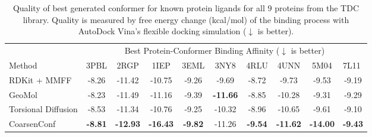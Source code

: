 \begin{table}[b]%
\vspace{-1ex}
\begin{center}
\caption{Quality of best generated conformer for known protein ligands for all 9 proteins from the TDC library. Quality is measured by free energy change (kcal/mol) of the binding process with AutoDock Vina's flexible docking simulation ($\downarrow$ is better).
}
\label{tab:results_oracle}
\begin{tabular}{l|ccccccccc}
\toprule
                    & \multicolumn{9}{c}{Best Protein-Conformer Binding Affinity ($\downarrow$ is better)}                                                                                                                   \\
Method              & 3PBL           & 2RGP            & 1IEP            & 3EML           & 3NY8            & 4RLU & 4UNN            & 5M04            & \multicolumn{1}{l}{7L11}          \\ \hline
RDKit + MMFF       & -8.26          & -11.42          & -10.75          & -9.26          & -9.69           &   -8.72   & -9.73           & -9.53           & -9.19                             \\
GeoMol              & -8.23          & -11.49          & -11.16          & -9.39          & \textbf{-11.66} &  -8.85    & -10.28          & -9.31           & -9.29                             \\
Torsional Diffusion & -8.53          & -11.34          & -10.76          & -9.25          & -10.32          &   -8.96   & -10.65          & -9.61           & -9.10                             \\
CoarsenConf       & \textbf{-8.81} & \textbf{-12.93} & \textbf{-16.43} & \textbf{-9.82} & -11.26          &   \textbf{-9.54}   & \textbf{-11.62} & \textbf{-14.00} & \textbf{-9.43}                    \\ \hline
\end{tabular}
\end{center}
\vspace{-2ex}
\end{table}
\vspace{-1ex}
